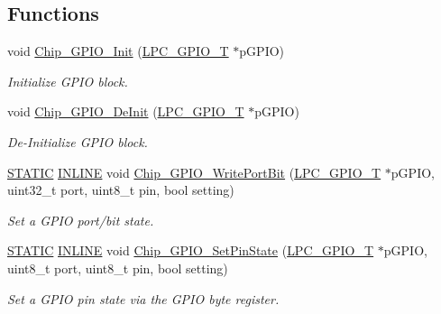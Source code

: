\subsection*{Functions}
\begin{DoxyCompactItemize}
\item 
void \hyperlink{group___g_p_i_o__18_x_x__43_x_x_gad799db2a825ded50fc7998f228db1b24}{Chip\+\_\+\+G\+P\+I\+O\+\_\+\+Init} (\hyperlink{struct_l_p_c___g_p_i_o___t}{L\+P\+C\+\_\+\+G\+P\+I\+O\+\_\+T} $\ast$p\+G\+P\+IO)
\begin{DoxyCompactList}\small\item\em Initialize G\+P\+IO block. \end{DoxyCompactList}\item 
void \hyperlink{group___g_p_i_o__18_x_x__43_x_x_gab713ee553d3115b4484e77810f2737a5}{Chip\+\_\+\+G\+P\+I\+O\+\_\+\+De\+Init} (\hyperlink{struct_l_p_c___g_p_i_o___t}{L\+P\+C\+\_\+\+G\+P\+I\+O\+\_\+T} $\ast$p\+G\+P\+IO)
\begin{DoxyCompactList}\small\item\em De-\/\+Initialize G\+P\+IO block. \end{DoxyCompactList}\item 
\hyperlink{group___l_p_c___types___public___macros_ga10b2d890d871e1489bb02b7e70d9bdfb}{S\+T\+A\+T\+IC} \hyperlink{spifi__18xx__43xx_8h_a2eb6f9e0395b47b8d5e3eeae4fe0c116}{I\+N\+L\+I\+NE} void \hyperlink{group___g_p_i_o__18_x_x__43_x_x_ga4ce4cce2499df5cee49a591ee5be6a48}{Chip\+\_\+\+G\+P\+I\+O\+\_\+\+Write\+Port\+Bit} (\hyperlink{struct_l_p_c___g_p_i_o___t}{L\+P\+C\+\_\+\+G\+P\+I\+O\+\_\+T} $\ast$p\+G\+P\+IO, uint32\+\_\+t port, uint8\+\_\+t pin, bool setting)
\begin{DoxyCompactList}\small\item\em Set a G\+P\+IO port/bit state. \end{DoxyCompactList}\item 
\hyperlink{group___l_p_c___types___public___macros_ga10b2d890d871e1489bb02b7e70d9bdfb}{S\+T\+A\+T\+IC} \hyperlink{spifi__18xx__43xx_8h_a2eb6f9e0395b47b8d5e3eeae4fe0c116}{I\+N\+L\+I\+NE} void \hyperlink{group___g_p_i_o__18_x_x__43_x_x_ga2d8db9f0a52f061d64e8cada713ae03e}{Chip\+\_\+\+G\+P\+I\+O\+\_\+\+Set\+Pin\+State} (\hyperlink{struct_l_p_c___g_p_i_o___t}{L\+P\+C\+\_\+\+G\+P\+I\+O\+\_\+T} $\ast$p\+G\+P\+IO, uint8\+\_\+t port, uint8\+\_\+t pin, bool setting)
\begin{DoxyCompactList}\small\item\em Set a G\+P\+IO pin state via the G\+P\+IO byte register. \end{DoxyCompactList}\item 

\end{DoxyCompactItemize}
